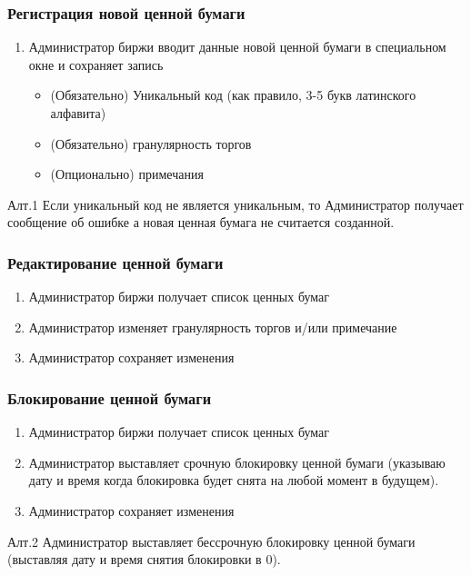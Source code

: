 \documentclass[a4paper, 12pt]{article}        %
\begin{document}
\subsubsection{Регистрация новой ценной бумаги}

\begin{enumerate}
\item Администратор биржи вводит данные новой ценной бумаги в специальном окне и сохраняет запись
\begin{itemize}
\item (Обязательно) Уникальный код (как правило, 3-5 букв латинского алфавита)
\item (Обязательно) гранулярность торгов
\item (Опционально) примечания
\end{itemize}
\end{enumerate}

Алт.1 Если уникальный код не является уникальным, то Администратор получает сообщение об ошибке а новая ценная бумага не считается созданной.

\subsubsection{Редактирование ценной бумаги}

\begin{enumerate}
\item Администратор биржи получает список ценных бумаг
\item Администратор изменяет гранулярность торгов и/или примечание
\item Администратор сохраняет изменения
\end{enumerate}

\subsubsection{Блокирование ценной бумаги}

\begin{enumerate}
\item Администратор биржи получает список ценных бумаг
\item Администратор выставляет срочную блокировку ценной бумаги (указываю дату и время когда блокировка будет снята на любой момент в будущем).
\item Администратор сохраняет изменения
\end{enumerate}

Алт.2 Администратор выставляет бессрочную блокировку ценной бумаги (выставляя дату и время снятия блокировки в 0).
\end{document}
